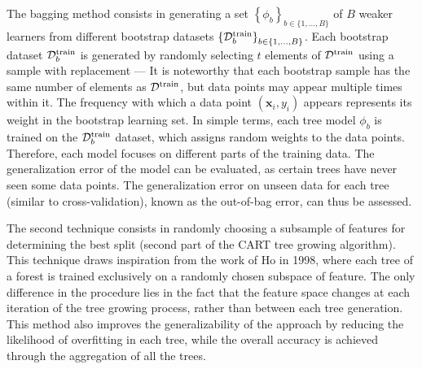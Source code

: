 \documentclass[main]{subfiles}
\begin{document}
The bagging method consists in generating a set ${\left\{\phi_b\right\}}_{b\in \{1,\ldots,B\}}$ of $B$ weaker learners from different bootstrap datasets ${\left\{\mathcal{D}^{\text{train}}_b\right\}}_{b\in \{1,\ldots,B\}}$. Each bootstrap dataset $\mathcal{D}^{\text{train}}_b$ is generated by randomly selecting $t$ elements of $\mathcal{D}^{\text{train}}$ using a sample with replacement --- It is noteworthy that each bootstrap sample has the same number of elements as $\mathcal{D}^{\text{train}}$, but data points may appear multiple times within it. The frequency with which a data point $(\mathbf{x}_i,y_i)$ appears represents its weight in the bootstrap learning set. In simple terms, each tree model $\phi_b$ is trained on the $\mathcal{D}^{\text{train}}_b$ dataset, which assigns random weights to the data points. Therefore, each model focuses on different parts of the training data. The generalization error of the model can be evaluated, as certain trees have never seen some data points. The generalization error on unseen data for each tree (similar to cross-validation), known as the out-of-bag error, can thus be assessed. 

The second technique consists in randomly choosing a subsample of features for determining the best split (second part of the CART tree growing algorithm). This technique draws inspiration from the work of Ho in 1998, where each tree of a forest is trained exclusively on a randomly chosen subspace of feature.\autocite{Tin_Kam_Ho_1998} The only difference in the procedure lies in the fact that the feature space changes at each iteration of the tree growing process, rather than between each tree generation. This method also improves the generalizability of the approach by reducing the likelihood of overfitting in each tree, while the overall accuracy is achieved through the aggregation of all the trees.
\end{document}
